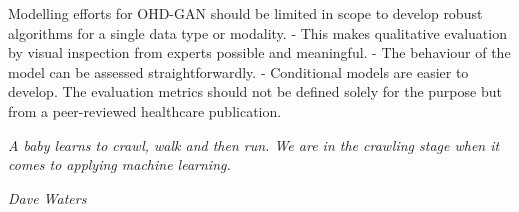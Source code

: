 \footnotesize
{}
\begin{tcolorbox}[arc=0mm, 
    colback=cadmiumgreen!10!white, 
    coltext=cadmiumgreen!90!black,  
    colframe=cadmiumgreen!90!black,
    colbacktitle=cadmiumgreen!80,
    leftrule=3mm,
    rightrule=0mm, 
    toprule=0mm, 
    bottomrule=0mm, 
    box align=top]

Modelling efforts for OHD-GAN should be limited in scope to develop robust algorithms for a single data type or modality. 
- This makes qualitative evaluation by visual inspection from experts possible and meaningful.
- The behaviour of the model can be assessed straightforwardly. 
- Conditional models are easier to develop. 
The evaluation metrics should not be defined solely for the purpose but from a peer-reviewed healthcare publication.

\end{tcolorbox}
\hfill
\begin{tcolorbox}[tcbox width=auto, 
    arc=0mm, 
    colback=white, 
    coltext=cadmiumgreen, 
    boxrule=0pt, 
    colframe=white,
    box align=top]
    
\epigraph{\textit{A baby learns to crawl, walk and then run.  We are in the crawling stage when it comes to applying machine learning.}}{\textit{Dave Waters}}

\end{tcolorbox}
\normalsize